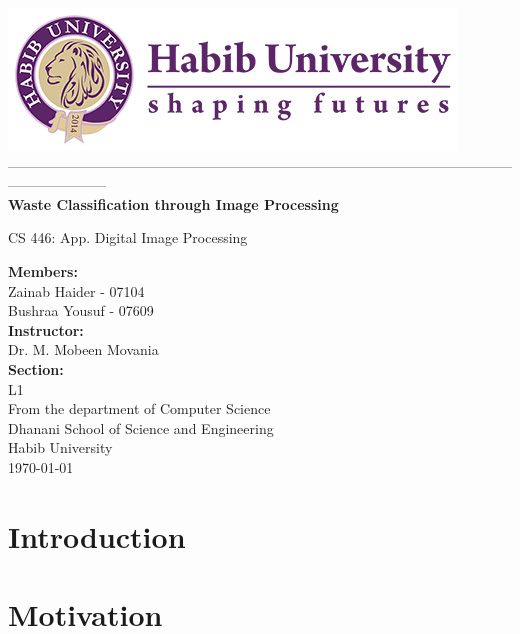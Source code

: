 \documentclass{article}
\begin{document}
\begin{titlepage}
    \centering
    \includegraphics[scale = 0.6]{logo.jpg}
    \\---------------------------------------------------------------------------------------------------------------------------------
    \vspace{0.5cm}
    \\\huge\textbf{Waste Classification through Image Processing}\par
    \vspace{0.5cm}
    \Large{CS 446: App. Digital Image Processing}\par
    \vspace{1.5cm}
    \large\textbf{Members:}
    \\ \large{Zainab Haider - 07104}
    \\ \large{Bushraa Yousuf - 07609}
    \vspace{0.5cm}
    \\\large\textbf{Instructor:}
    \\\large{Dr. M. Mobeen Movania}
    \vspace{0.5cm}
    \\\large\textbf{Section:}
    \\\large{L1}
    \vspace{1.7cm}
    \\\large{From the department of Computer Science}
    \\\large{Dhanani School of Science and Engineering}
    \\\large{Habib University}
    \\\large{\today}
\end{titlepage}

\tableofcontents
\vspace{7.3cm}
\section{Introduction}

\section{Motivation}
\end{document}
